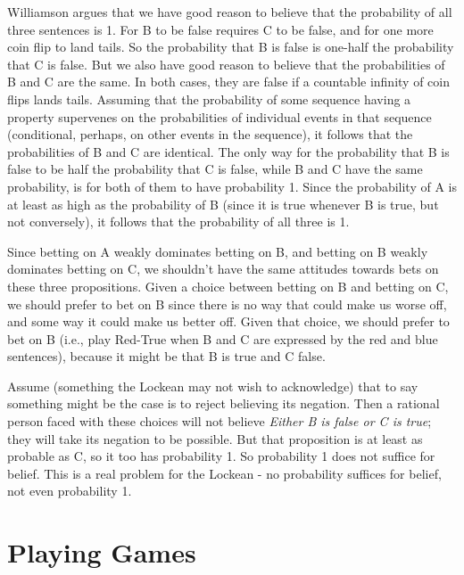 \documentclass[
  10pt,
  letterpaper,
  twoside]{scrbook}
\begin{document}
Williamson argues that we have good reason to believe that the
probability of all three sentences is 1. For B to be false requires C to
be false, and for one more coin flip to land tails. So the probability
that B is false is one-half the probability that C is false. But we also
have good reason to believe that the probabilities of B and C are the
same. In both cases, they are false if a countable infinity of coin
flips lands tails. Assuming that the probability of some sequence having
a property supervenes on the probabilities of individual events in that
sequence (conditional, perhaps, on other events in the sequence), it
follows that the probabilities of B and C are identical. The only way
for the probability that B is false to be half the probability that C is
false, while B and C have the same probability, is for both of them to
have probability 1. Since the probability of A is at least as high as
the probability of B (since it is true whenever B is true, but not
conversely), it follows that the probability of all three is 1.

Since betting on A weakly dominates betting on B, and betting on B
weakly dominates betting on C, we shouldn't have the same attitudes
towards bets on these three propositions. Given a choice between betting
on B and betting on C, we should prefer to bet on B since there is no
way that could make us worse off, and some way it could make us better
off. Given that choice, we should prefer to bet on B (i.e., play
Red-True when B and C are expressed by the red and blue sentences),
because it might be that B is true and C false.

Assume (something the Lockean may not wish to acknowledge) that to say
something might be the case is to reject believing its negation. Then a
rational person faced with these choices will not believe \emph{Either B
is false or C is true}; they will take its negation to be possible. But
that proposition is at least as probable as C, so it too has probability
1. So probability 1 does not suffice for belief. This is a real problem
for the Lockean - no probability suffices for belief, not even
probability 1.

\section{Playing Games}\label{sec-lockegames}
\end{document}
